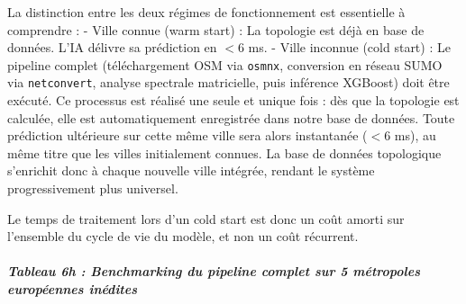 \documentclass[10pt, a4paper]{article}
\begin{document}
La distinction entre les deux régimes de fonctionnement est essentielle
à comprendre : - Ville connue (warm start) : La topologie est déjà en
base de données. L'IA délivre sa prédiction en \(< 6\) ms. - Ville
inconnue (cold start) : Le pipeline complet (téléchargement OSM via
\texttt{osmnx}, conversion en réseau SUMO via \texttt{netconvert},
analyse spectrale matricielle, puis inférence XGBoost) doit être
exécuté. Ce processus est réalisé une seule et unique fois : dès que la
topologie est calculée, elle est automatiquement enregistrée dans notre
base de données. Toute prédiction ultérieure sur cette même ville sera
alors instantanée (\(< 6\) ms), au même titre que les villes
initialement connues. La base de données topologique s'enrichit donc à
chaque nouvelle ville intégrée, rendant le système progressivement plus
universel.

Le temps de traitement lors d'un cold start est donc un coût amorti sur
l'ensemble du cycle de vie du modèle, et non un coût récurrent.

\subparagraph{Tableau 6h : Benchmarking du pipeline complet sur 5
métropoles européennes
inédites}\label{tableau-6h-benchmarking-du-pipeline-complet-sur-5-muxe9tropoles-europuxe9ennes-inuxe9dites}
\end{document}
